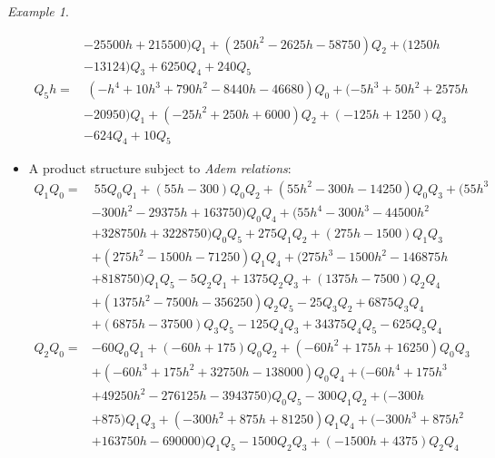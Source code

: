 \documentclass{gtpart}
\theoremstyle{definition}
\theoremstyle{remark}
\newtheorem{ex}[equation]{Example}
\renewcommand{\=}{\approx}
\renewcommand{\-}{\sim}
\numberwithin{equation}{section}
\begin{document}
\begin{ex}
\begin{itemize}
\begin{equation*}
\begin{split}
            & - 25500 h + 215500) Q_1 + (250 h^2 - 2625 h - 58750) Q_2 + (1250 h \\
            & - 13124) Q_3 + 6250 Q_4 + 240 Q_5 \\
    Q_5 h = & ~ (-h^4 + 10 h^3 + 790 h^2 - 8440 h - 46680) Q_0 + (-5 h^3 + 50 h^2 + 2575 h \\
            & - 20950) Q_1 + (-25 h^2 + 250 h + 6000) Q_2 + (-125 h + 1250) Q_3 \\
            & - 624 Q_4 + 10 Q_5 
   \end{split}
  \end{equation*}

  \item A product structure subject to {\em Adem relations}: 
  \begin{equation*}
   \begin{split}
    Q_1 Q_0 = & ~ 55 Q_0 Q_1 + (55 h - 300) Q_0 Q_2 + (55 h^2 - 300 h - 14250) Q_0 Q_3 + (55 h^3 \\
              & - 300 h^2 - 29375 h + 163750) Q_0 Q_4 + (55 h^4 - 300 h^3 - 44500 h^2 \\
              & + 328750 h + 3228750) Q_0 Q_5 + 275 Q_1 Q_2 + (275 h - 1500) Q_1 Q_3 \\
              & + (275 h^2 - 1500 h - 71250) Q_1 Q_4 + (275 h^3 - 1500 h^2 - 146875 h \\
              & + 818750) Q_1 Q_5 - 5 Q_2 Q_1 + 1375 Q_2 Q_3 + (1375 h - 7500) Q_2 Q_4 
   \end{split}
  \end{equation*}
  \begin{equation*}
   \begin{split}
              & + (1375 h^2 - 7500 h - 356250) Q_2 Q_5 - 25 Q_3 Q_2 + 6875 Q_3 Q_4 \\
              & + (6875 h - 37500) Q_3 Q_5 - 125 Q_4 Q_3 + 34375 Q_4 Q_5 - 625 Q_5 Q_4 \\
    Q_2 Q_0 = & -60 Q_0 Q_1 + (-60 h + 175) Q_0 Q_2 + (-60 h^2 + 175 h + 16250) Q_0 Q_3 \\
              & + (-60 h^3 + 175 h^2 + 32750 h - 138000) Q_0 Q_4 + (-60 h^4 + 175 h^3 \\
              & + 49250 h^2 - 276125 h - 3943750) Q_0 Q_5 - 300 Q_1 Q_2 + (-300 h \\
              & + 875) Q_1 Q_3 + (-300 h^2 + 875 h + 81250) Q_1 Q_4 + (-300 h^3 + 875 h^2 \\
              & + 163750 h - 690000) Q_1 Q_5 - 1500 Q_2 Q_3 + (-1500 h + 4375) Q_2 Q_4 \\

\end{split}
\end{equation*}
\end{itemize}
\end{ex}
\end{document}
